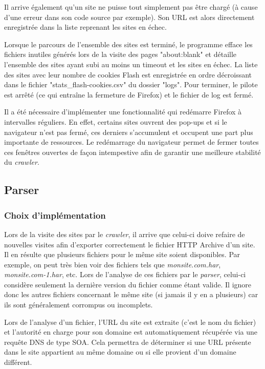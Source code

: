 Il arrive également qu'un site ne puisse tout simplement pas être chargé (à cause d'une erreur dans son code source par exemple). Son URL est alors directement enregistrée dans la liste reprenant les sites en échec.
\newline
\newpage

Lorsque le parcours de l'ensemble des sites est terminé, le programme efface les fichiers inutiles générés lors de la visite des pages "about:blank" et détaille l'ensemble des sites ayant subi au moins un timeout et les sites en échec. La liste des sites avec leur nombre de cookies Flash est enregistrée en ordre décroissant dans le fichier "stats\_flash-cookies.csv" du dossier "logs". Pour terminer, le pilote est arrêté (ce qui entraîne la fermeture de Firefox) et le fichier de log est fermé.
\newline

Il a été nécessaire d'implémenter une fonctionnalité qui redémarre Firefox à intervalles réguliers. En effet, certains sites ouvrent des pop-ups et si le navigateur n'est pas fermé, ces derniers s'accumulent et occupent une part plus importante de ressources. Le redémarrage du navigateur permet de fermer toutes ces fenêtres ouvertes de façon intempestive afin de garantir une meilleure stabilité du \textit{crawler}.

\subsection{Parser}
\label{parser}
\subsubsection{Choix d'implémentation}
Lors de la visite des sites par le \textit{crawler}, il arrive que celui-ci doive refaire de nouvelles visites afin d'exporter correctement le fichier HTTP Archive d'un site. Il en résulte que plusieurs fichiers pour le même site soient disponibles. Par exemple, on peut très bien voir des fichiers tels que \textit{monsite.com.har}, \textit{monsite.com-1.har}, etc. Lors de l'analyse de ces fichiers par le \textit{parser}, celui-ci considère seulement la dernière version du fichier comme étant valide. Il ignore donc les autres fichiers concernant le même site (si jamais il y en a plusieurs) car ils sont généralement corrompus ou incomplets.
\newline

Lors de l'analyse d'un fichier, l'URL du site est extraite (c'est le nom du fichier) et l'autorité en charge pour son domaine est automatiquement récupérée via une requête DNS de type SOA. Cela permettra de déterminer si une URL présente dans le site appartient au même domaine ou si elle provient d'un domaine différent.

